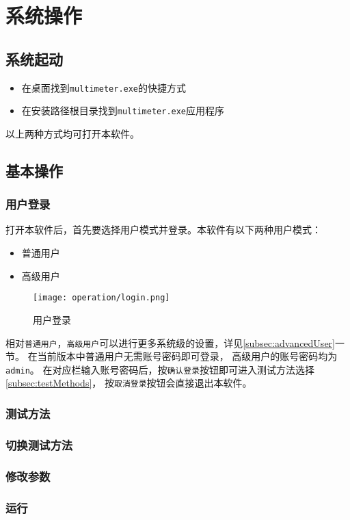 \chapter{系统操作}
\section{系统起动}
\begin{itemize}
    \item 在桌面找到\lstinline{multimeter.exe}的快捷方式
    \item 在安装路径根目录找到\lstinline{multimeter.exe}应用程序
\end{itemize}
以上两种方式均可打开本软件。
\section{基本操作}
\subsection{用户登录}
打开本软件后，首先要选择用户模式并登录。本软件有以下两种用户模式：
\begin{itemize}
    \item 普通用户
    \item 高级用户
\end{itemize}
\begin{figure}[htbp]
    \centering
    \texttt{[image: operation/login.png]}
    \caption{ 用户登录 \label{fig:login}}
\end{figure}    
相对\lstinline{普通用户}，\lstinline{高级用户}可以进行更多系统级的设置，详见\ref{subsec:advancedUser}一节。
在当前版本中普通用户无需账号密码即可登录，
高级用户的账号密码均为\lstinline{admin}。
在对应栏输入账号密码后，按\lstinline{确认登录}按钮即可进入测试方法选择\ref{subsec:testMethods}，
按\lstinline{取消登录}按钮会直接退出本软件。
\subsection{测试方法\label{subsec:testMethods}}
\subsection{切换测试方法}
\subsection{修改参数}
\subsection{运行}
